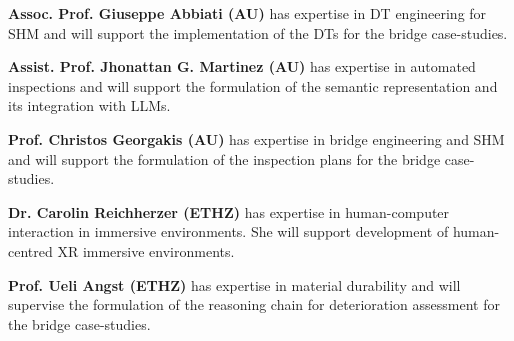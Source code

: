 \documentclass[12pt,a4paper]{article}
\newcommand{\asset}{bridge case-studies}
\begin{document}


\textbf{Assoc. Prof. Giuseppe Abbiati (AU)} has expertise in DT engineering for SHM and will support the implementation of the DTs for the \asset. \par
\vspace{-0.2cm}
\textbf{Assist. Prof. Jhonattan G. Martinez (AU)} has expertise in automated inspections and will support the formulation of the semantic representation and its integration with LLMs. \par
\vspace{-0.2cm}
\textbf{Prof. Christos Georgakis (AU)} has expertise in bridge engineering and SHM and will support the formulation of the inspection plans for the \asset. \par
\vspace{-0.2cm}
\textbf{Dr. Carolin Reichherzer (ETHZ)} has expertise in human-computer interaction in immersive environments. She will support development of human-centred XR immersive environments. \par
\vspace{-0.2cm}
\textbf{Prof. Ueli Angst (ETHZ)} has expertise in material durability and will supervise the formulation of the reasoning chain for deterioration assessment for the \asset.
%
\end{document}

